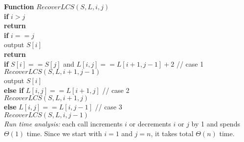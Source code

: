 \documentclass[11pt]{article}
\begin{document}
\begin{enumerate}
  \textbf{Function} $RecoverLCS(S, L, i, j)$\\
  \-\hspace{2em} \textbf{if} $i > j$\\
  \-\hspace{4em} \textbf{return}\\
  \-\hspace{2em} \textbf{if} $i == j$\\
  \-\hspace{4em} output $S[i]$\\
  \-\hspace{4em} \textbf{return}\\
  \-\hspace{2em} \textbf{if} $S[i] == S[j]$ and $L[i,j] == L[i+1,
    j-1]+2$  // case 1\\ 
  \-\hspace{4em} $RecoverLCS(S, L, i+1, j-1)$\\
  \-\hspace{4em} output $S[i]$\\
  \-\hspace{2em} \textbf{else if} $L[i,j] == L[i+1,j]$ // case 2\\
  \-\hspace{4em} $RecoverLCS(S, L, i+1, j)$\\
  \-\hspace{2em} \textbf{else} $L[i,j] == L[i,j-1]$ // case 3\\
  \-\hspace{4em} $RecoverLCS(S, L, i, j-1)$\\

  \emph{Run time analysis:} each call increments $i$ or decrements $i$
  or $j$ by 1 and spends $\Theta(1)$ time. Since we start with $i=1$
  and $j=n$, it takes total $\Theta(n)$ time.

\end{enumerate}
\end{document}

